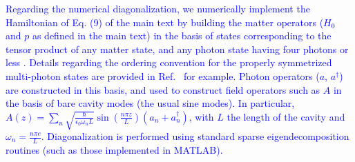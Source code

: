 \documentclass[aps,prb,onecolumn,preprint,
	groupedaddress,superscriptaddress,
	amsfonts,amssymb,amsmath,floatfix,
	citeautoscript]{revtex4-1}
\begin{document}
\textcolor{blue}{Regarding the numerical diagonalization, we numerically implement the Hamiltonian of Eq. (9) of the main text by building the matter operators ($H_0$ and $p$ as defined in the main text) in the basis of states corresponding to the tensor product of any matter state, and any photon state having four photons or less . Details regarding the ordering convention for the properly symmetrized multi-photon states are provided in Ref.~ \cite{flick2017} for example. Photon operators ($a$, $a^{\dagger}$) are constructed in this basis, and used to construct field operators such as $A$ in the basis of bare cavity modes (the usual sine modes). In particular, $A(z) = \sum_n\sqrt{\frac{\hbar}{\epsilon_0\omega_n L}}\sin\left(\frac{n\pi z}{L} \right) \left(a_n+a^{\dagger}_n\right)$, with $L$ the length of the cavity and $\omega_n = \frac{n\pi c}{L}$. Diagonalization is performed using standard sparse eigendecomposition routines (such as those implemented in MATLAB).}



\end{document}
